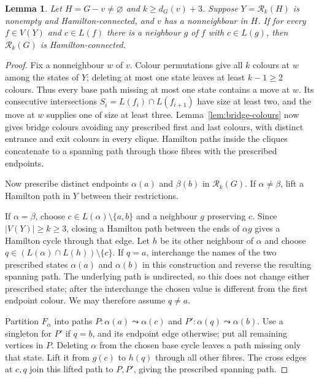 \documentclass[11pt]{article}
\newtheorem{lemma}[theorem]{Lemma}
\theoremstyle{remark}
\newcommand{\Rk}{\mathcal R_k}
\numberwithin{equation}{section}
\numberwithin{table}{section}
\begin{document}
\begin{lemma}\label{lem:clique-endpoints}
Let $H=G-v\ne\varnothing$ and $k\ge d_G(v)+3$.
Suppose $Y=\Rk(H)$ is nonempty and Hamilton-connected, and $v$ has
a nonneighbour in $H$. If for every $f\in V(Y)$ and $c\in L(f)$
there is a neighbour $g$ of $f$ with $c\in L(g)$, then
$\Rk(G)$ is Hamilton-connected.
\end{lemma}
\begin{proof}
Fix a nonneighbour $w$ of $v$. Colour permutations give all $k$
colours at $w$ among the states of $Y$; deleting at most one state
leaves at least $k-1\ge2$ colours. Thus every base path missing at
most one state contains a move at $w$. Its consecutive intersections
$S_i=L(f_i)\cap L(f_{i+1})$ have size at least two, and the move at
$w$ supplies one of size at least three.
Lemma~\ref{lem:bridge-colours} now gives bridge colours avoiding any
prescribed first and last colours, with distinct entrance and exit
colours in every clique. Hamilton paths inside the cliques concatenate
to a spanning path through those fibres with the prescribed endpoints.

Now prescribe distinct endpoints $\alpha(a)$ and $\beta(b)$ in
$\Rk(G)$. If $\alpha\ne\beta$, lift a Hamilton path in $Y$ between
their restrictions.

If $\alpha=\beta$, choose $c\in L(\alpha)\setminus\{a,b\}$ and
a neighbour $g$ preserving $c$. Since $|V(Y)|\ge k\ge3$, closing
a Hamilton path between the ends of $\alpha g$ gives a Hamilton
cycle through that edge. Let $h$ be its other neighbour of $\alpha$
and choose $q\in(L(\alpha)\cap L(h))\setminus\{c\}$.
If $q=a$, interchange the names of the two prescribed states
$\alpha(a)$ and $\alpha(b)$ in this construction and reverse the
resulting spanning path.  The underlying path is undirected, so this
does not change either prescribed state; after the interchange the
chosen value is different from the first endpoint colour.  We may
therefore assume $q\ne a$.

Partition $F_\alpha$ into paths
$P:\alpha(a)\leadsto\alpha(c)$ and
$P':\alpha(q)\leadsto\alpha(b)$.
Use a singleton for $P'$ if $q=b$, and its endpoint edge otherwise;
put all remaining vertices in $P$. Deleting $\alpha$ from the chosen
base cycle leaves a path missing only that state. Lift it from $g(c)$
to $h(q)$ through all other fibres. The cross edges at $c,q$ join
this lifted path to $P,P'$, giving the prescribed spanning path.
\end{proof}
\end{document}
